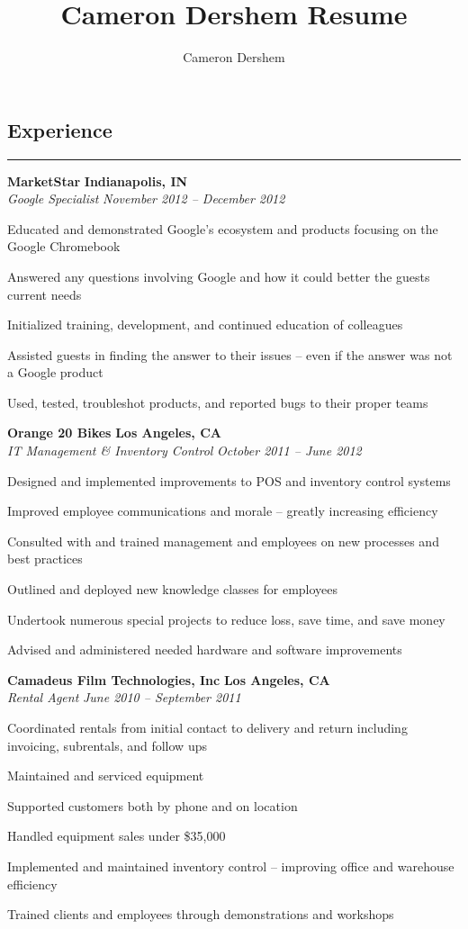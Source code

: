 \documentclass[10pt,letterpaper]{article}			%
\author{Cameron Dershem}							%
\title{Cameron Dershem Resume}						%
\newcommand{\JobHeader}[4]{							%
			\vspace{-.4em}
			\textbf{#1}
			\hfill
			\textbf{#2}
			\\
			\emph{#3}
			\hfill
			\emph{#4}\par
			\vspace{-1em}
			}
\begin{document}

\subsection*{Experience}
\vspace{-.68em}
\hrule
\vspace{0.8em}

	\JobHeader{MarketStar}{Indianapolis, IN}{Google Specialist}{November 2012 -- December 2012}
		\begin{itemize*}
		\item Educated and demonstrated Google's ecosystem and products focusing on the Google Chromebook
		\item Answered any questions involving Google and how it could better the guests current needs
		\item Initialized training, development, and continued education of colleagues
		\item Assisted guests in finding the answer to their issues -- even if the answer was not a Google product
		\item Used, tested, troubleshot products, and reported bugs to their proper teams
		\end{itemize*}

	\JobHeader{Orange 20 Bikes}{Los Angeles, CA}{IT Management \& Inventory Control}{October 2011 -- June 2012}
		\begin{itemize*}	
		\item Designed and implemented improvements to POS and inventory control systems
		\item Improved employee communications and morale -- greatly increasing efficiency
		\item Consulted with and trained management and employees on new processes and best practices
		\item Outlined and deployed new knowledge classes for employees 
		\item Undertook numerous special projects to reduce loss, save time, and save money
		\item Advised and administered needed hardware and software improvements
		\end{itemize*}

	\JobHeader{Camadeus Film Technologies, Inc}{Los Angeles, CA}{Rental Agent}{June 2010 -- September 2011}
		\begin{itemize*}
		\item Coordinated rentals from initial contact to delivery and return including invoicing, subrentals, and follow ups
		\item Maintained and serviced equipment
		\item Supported customers both by phone and on location
		\item Handled equipment sales under \$35,000
		\item Implemented and maintained inventory control -- improving office and warehouse efficiency
		\item Trained clients and employees through demonstrations and workshops
		\end{itemize*}
\end{document}
